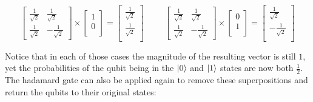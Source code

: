 \documentclass{article}
\begin{document}
\begin{center}
	\[
		\begin{bmatrix}
			\frac{1}{\sqrt{2}} & \frac{1}{\sqrt{2}} \\
			\frac{1}{\sqrt{2}} & -\frac{1}{\sqrt{2}}
		\end{bmatrix}
		\times
		\begin{bmatrix}
			1 \\
			0 \\
		\end{bmatrix}
		=
		\begin{bmatrix}
			\frac{1}{\sqrt{2}} \\
			\frac{1}{\sqrt{2}} \\
		\end{bmatrix}
		\hspace{1cm}
		\begin{bmatrix}
			\frac{1}{\sqrt{2}} & \frac{1}{\sqrt{2}} \\
			\frac{1}{\sqrt{2}} & -\frac{1}{\sqrt{2}}
		\end{bmatrix}
		\times
		\begin{bmatrix}
			0 \\
			1 \\
		\end{bmatrix}
		=
		\begin{bmatrix}
			\frac{1}{\sqrt{2}} \\
			-\frac{1}{\sqrt{2}} \\
		\end{bmatrix}
	\]
\end{center}

Notice that in each of those cases the magnitude of the resulting vector is still $1$, yet the probabilities of the qubit being in the $\ket{0}$ and $\ket{1}$ states are now
both $ \frac{1}{2}$. The hadamard gate can also be applied again to remove these superpositions and return the qubits to their original states:
\end{document}
